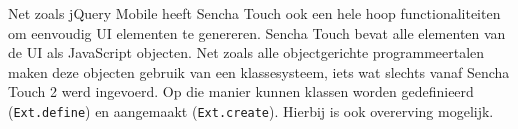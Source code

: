 \documentclass[a4paper]{article}
\newcommand{\code}[1]{\texttt{#1}}
\begin{document}



Net zoals jQuery Mobile heeft Sencha Touch ook een hele hoop functionaliteiten om eenvoudig UI elementen te genereren.  Sencha Touch bevat alle elementen van de UI als JavaScript objecten.  Net zoals alle objectgerichte programmeertalen maken deze objecten gebruik van een klassesysteem,  iets wat slechts vanaf Sencha Touch 2 werd ingevoerd.  Op die manier kunnen klassen worden gedefinieerd (\code{Ext.define}) en aangemaakt (\code{Ext.create}).  Hierbij is ook overerving mogelijk.  
% 
% 
\end{document}
